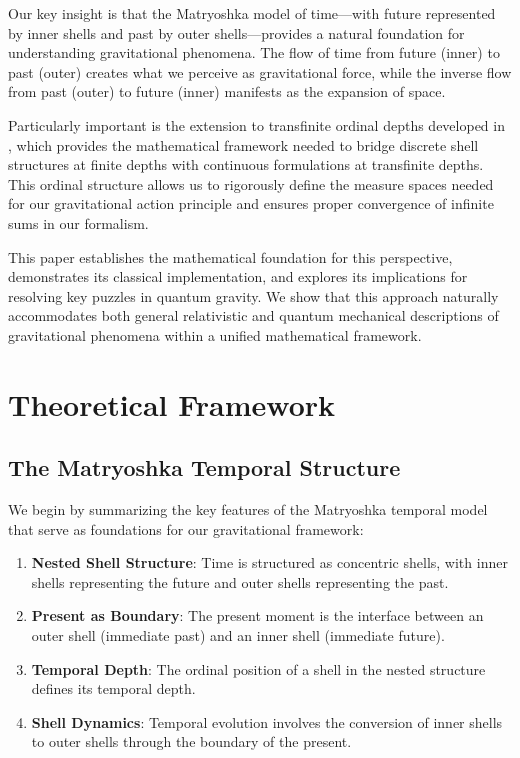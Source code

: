 \documentclass[12pt,a4paper]{article}
\begin{document}
Our key insight is that the Matryoshka model of time—with future represented by inner shells and past by outer shells—provides a natural foundation for understanding gravitational phenomena. The flow of time from future (inner) to past (outer) creates what we perceive as gravitational force, while the inverse flow from past (outer) to future (inner) manifests as the expansion of space.

Particularly important is the extension to transfinite ordinal depths developed in \citep{matryoshka}, which provides the mathematical framework needed to bridge discrete shell structures at finite depths with continuous formulations at transfinite depths. This ordinal structure allows us to rigorously define the measure spaces needed for our gravitational action principle and ensures proper convergence of infinite sums in our formalism.

This paper establishes the mathematical foundation for this perspective, demonstrates its classical implementation, and explores its implications for resolving key puzzles in quantum gravity. We show that this approach naturally accommodates both general relativistic and quantum mechanical descriptions of gravitational phenomena within a unified mathematical framework.

\section{Theoretical Framework}

\subsection{The Matryoshka Temporal Structure}

We begin by summarizing the key features of the Matryoshka temporal model that serve as foundations for our gravitational framework:

\begin{enumerate}
    \item \textbf{Nested Shell Structure}: Time is structured as concentric shells, with inner shells representing the future and outer shells representing the past.
    
    \item \textbf{Present as Boundary}: The present moment is the interface between an outer shell (immediate past) and an inner shell (immediate future).
    
    \item \textbf{Temporal Depth}: The ordinal position of a shell in the nested structure defines its temporal depth.
    
    \item \textbf{Shell Dynamics}: Temporal evolution involves the conversion of inner shells to outer shells through the boundary of the present.
\end{enumerate}
\end{document}
